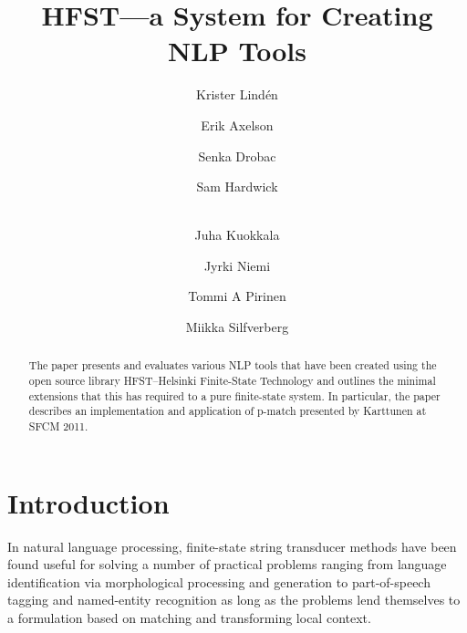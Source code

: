 \documentclass{llncs}
\begin{document}
%
\title{HFST---a System for Creating NLP Tools}
%
\author{Krister Lind\'{e}n \and Erik Axelson \and Senka Drobac \and Sam Hardwick \and\\
Juha Kuokkala \and Jyrki Niemi \and Tommi A Pirinen \and Miikka Silfverberg}

\institute{University of Helsinki\\
Department of Modern Languages\\
Unioninkatu 40 A\\
FI-00014 University of Helsinki, Finland\\
\email{\{krister.linden, erik.axelson, senka.drobac, sam.hardwick,\\
juha.kuokkala, jyrki.niemi, tommi.pirinen, miikka.silfverberg\}@helsinki.fi}}

\maketitle


\begin{abstract}
The paper presents and evaluates various NLP tools that have been created using the open source library HFST--Helsinki Finite-State Technology and outlines the minimal extensions that this has required to a pure finite-state system. In particular, the paper describes an implementation and application of p-match presented by Karttunen at SFCM 2011.
\end{abstract}

\section*{Introduction}
In natural language processing, finite-state string transducer methods have been found useful for solving a number of practical problems ranging from language identification via morphological processing and generation to part-of-speech tagging and named-entity recognition as long as the problems lend themselves to a formulation based on matching and transforming local context.
\end{document}

